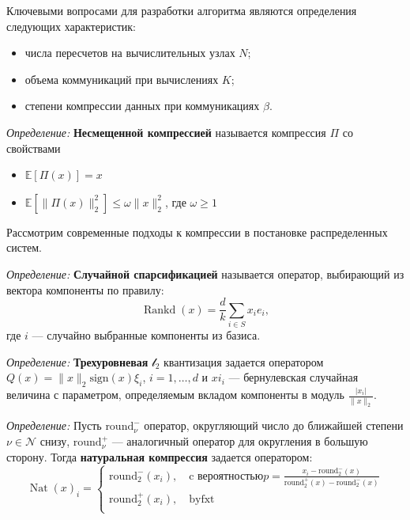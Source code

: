 Ключевыми вопросами для разработки алгоритма являются определения следующих характеристик:
 \begin{itemize}
    \item числа пересчетов на вычислительных узлах $N$;
    \item объема коммуникаций при вычислениях $K$;
    \item степени компрессии данных при коммуникациях $\beta$.
\end{itemize}
    
\textit{Определение:} \textbf{Несмещенной компрессией} называется компрессия $\Pi$ со свойствами 
\begin{itemize}
    \item $\mathbb{E}[\Pi(x)] = x$
    \item $\mathbb{E}[\|\Pi(x)\|^2_2] \le \omega \| x \|^2_2$, где $\omega \ge 1$
\end{itemize}

Рассмотрим современные подходы к компрессии в постановке распределенных систем. 

\textit{Определение:} \textbf{Случайной спарсификацией} \cite{richtarik2016parallel} называется оператор, 
выбирающий из вектора компоненты по правилу:
\begin{equation}
    \operatorname{Rankd}(x) = \frac{d}{k} \sum_{i \in S} x_i e_i,
\end{equation}
где $i$ --- случайно выбранные компоненты из базиса.

\textit{Определение:} \textbf{Трехуровневая} $\mathcal{l}_2$ квантизация задается оператором
$Q(x)=\|x\|_2 \text{sign}(x)\xi_i$, $i=1,\dots,d$  и $xi_i$ --- бернулевская случайная величина с параметром,
определяемым вкладом компоненты в модуль $\frac{|x_i|}{\|x\|_2}$.

\textit{Определение:} Пусть $\text{round}_\nu^-$ оператор, округляющий число до ближайшей степени $\nu \in \mathcal{N}$ снизу, 
$\text{round}_\nu^+$ --- аналогичный оператор для округления в большую сторону. Тогда \textbf{натуральная компрессия} 
задается оператором:
\begin{equation}
    \operatorname{Nat}(x)_i = \left\{\begin{array}{c}
        \text{round}_2^-(x_i), \quad \text{c вероятностью} p=\frac{x_i - \text{round}_2^-(x)}{\text{round}_2^+(x)-\text{round}_2^-(x)} \\
        \text{round}_2^+(x_i), \quad \text{byfxt}\\
    \end{array}\right.    
\end{equation}

